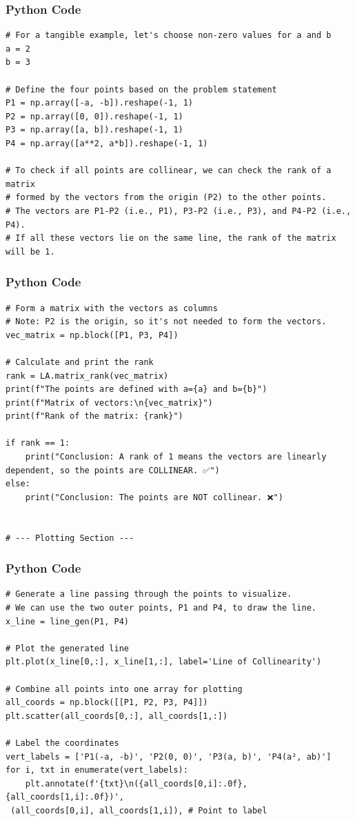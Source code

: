 \documentclass{beamer}
\begin{document}
\begin{frame}[fragile]
\frametitle{Python Code}
\begin{lstlisting}
# For a tangible example, let's choose non-zero values for a and b
a = 2
b = 3

# Define the four points based on the problem statement
P1 = np.array([-a, -b]).reshape(-1, 1)
P2 = np.array([0, 0]).reshape(-1, 1)
P3 = np.array([a, b]).reshape(-1, 1)
P4 = np.array([a**2, a*b]).reshape(-1, 1)

# To check if all points are collinear, we can check the rank of a matrix
# formed by the vectors from the origin (P2) to the other points.
# The vectors are P1-P2 (i.e., P1), P3-P2 (i.e., P3), and P4-P2 (i.e., P4).
# If all these vectors lie on the same line, the rank of the matrix will be 1.
\end{lstlisting}
\end{frame}
\begin{frame}[fragile]
\frametitle{Python Code}
\begin{lstlisting}
# Form a matrix with the vectors as columns
# Note: P2 is the origin, so it's not needed to form the vectors.
vec_matrix = np.block([P1, P3, P4])

# Calculate and print the rank
rank = LA.matrix_rank(vec_matrix)
print(f"The points are defined with a={a} and b={b}")
print(f"Matrix of vectors:\n{vec_matrix}")
print(f"Rank of the matrix: {rank}")

if rank == 1:
    print("Conclusion: A rank of 1 means the vectors are linearly dependent, so the points are COLLINEAR. ✅")
else:
    print("Conclusion: The points are NOT collinear. ❌")


# --- Plotting Section ---
\end{lstlisting}
\end{frame}
\begin{frame}[fragile]
\frametitle{Python Code}
\begin{lstlisting}
# Generate a line passing through the points to visualize.
# We can use the two outer points, P1 and P4, to draw the line.
x_line = line_gen(P1, P4)

# Plot the generated line
plt.plot(x_line[0,:], x_line[1,:], label='Line of Collinearity')

# Combine all points into one array for plotting
all_coords = np.block([[P1, P2, P3, P4]])
plt.scatter(all_coords[0,:], all_coords[1,:])

# Label the coordinates
vert_labels = ['P1(-a, -b)', 'P2(0, 0)', 'P3(a, b)', 'P4(a², ab)']
for i, txt in enumerate(vert_labels):
    plt.annotate(f'{txt}\n({all_coords[0,i]:.0f}, {all_coords[1,i]:.0f})',
 (all_coords[0,i], all_coords[1,i]), # Point to label
 \end{lstlisting}
\end{frame}
\end{document}
